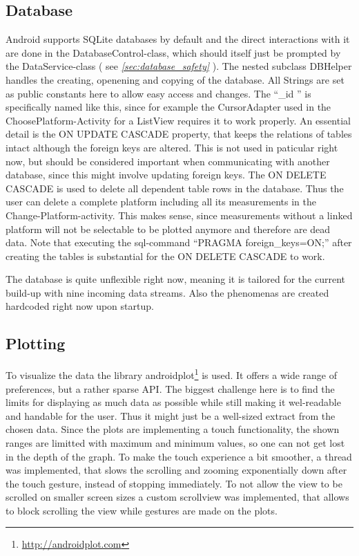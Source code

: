 \documentclass[11pt,oneside,a4paper]{scrartcl}
\begin{document}
\subsection{Database}
Android supports SQLite databases by default and the direct interactions with it are done in the DatabaseControl-class, which should itself just be prompted by the DataService-class ( see \textit{\ref{sec:database_safety}} ). The nested subclass DBHelper handles the creating, openening and copying of the database. All Strings are set as public constants here to allow easy access and changes. The ``\_{}id '' is specifically named like this, since for example the CursorAdapter used in the ChoosePlatform-Activity for a ListView requires it to work properly. An essential detail is the ON UPDATE CASCADE property, that keeps the relations of tables intact although the foreign keys are altered. This is not used in paticular right now, but should be considered important when communicating with another database, since this might involve updating foreign keys. The ON DELETE CASCADE is used to delete all dependent table rows in the database. Thus the user can delete a complete platform including all its measurements in the Change-Platform-activity. This makes sense, since measurements without a linked platform will not be selectable to be plotted anymore and therefore are dead data. Note that executing the sql-command ``PRAGMA foreign\_{}keys=ON;'' after creating the tables is substantial for the ON DELETE CASCADE to work.

The database is quite unflexible right now, meaning it is tailored for the current build-up with nine incoming data streams. Also the phenomenas are created hardcoded right now upon startup.


\subsection{Plotting}
To visualize the data the library androidplot\footnote{\url{http://androidplot.com}} is used. It offers a wide range of preferences, but a rather sparse API. The biggest challenge here is to find the limits for displaying as much data as possible while still making it wel-readable and handable for the user. Thus it might just be a well-sized extract from the chosen data.
Since the plots are implementing a touch functionality, the shown ranges are limitted with maximum and minimum values, so one can not get lost in the depth of the graph. 
To make the touch experience a bit smoother, a thread was implemented, that slows the scrolling and zooming exponentially down after the touch gesture, instead of stopping immediately.
To not allow the view to be scrolled on smaller screen sizes a custom scrollview was implemented, that allows to block scrolling the view while gestures are made on the plots.
\end{document}
